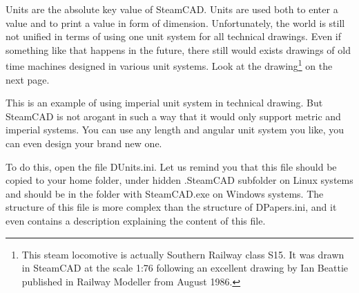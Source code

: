 Units are the absolute key value of SteamCAD. Units are used both to enter a value and
to print a value in form of dimension. Unfortunately, the world is still not unified
in terms of using one unit system for all technical drawings. Even if something like
that happens in the future, there still would exists drawings of old time machines
designed in various unit systems. Look at the drawing\footnote{This steam locomotive
is actually Southern Railway class S15. It was drawn in SteamCAD at the scale 1:76
following an excellent drawing by Ian Beattie published in Railway Modeller from August
1986.} on the next page.

This is an example of using imperial unit system in technical drawing. But SteamCAD
is not arogant in such a way that it would only support metric and imperial systems.
You can use any length and angular unit system you like, you can even design your
brand new one.

To do this, open the file DUnits.ini. Let us remind you that this file should be copied
to your home folder, under hidden .SteamCAD subfolder on Linux systems and should
be in the folder with SteamCAD.exe on Windows systems. The structure of this file
is more complex than the structure of DPapers.ini, and it even contains a description
explaining the content of this file.

\pagestyle{empty}
\begin{center}
\vspace*{-2cm}
\end{center}

